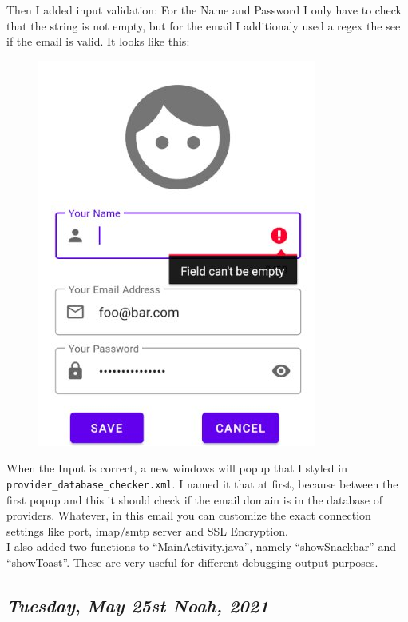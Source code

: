 Then I added input validation: For the Name and Password I only have to check that the string is not empty, but for the email I additionaly used a regex the see if the email is valid. It looks like this:\\

\begin{figure}[H]
\centering
\includegraphics[height=.3\textheight]{media/newemail}
\end{figure}

When the Input is correct, a new windows will popup that I styled in \texttt{provider\_database\_checker.xml}. I named it that at first, because between the first popup and this it should check if the email domain is in the database of providers. Whatever, in this email you can customize the exact connection settings like port, imap/smtp server and SSL Encryption.\\

I also added two functions to ``MainActivity.java'', namely ``showSnackbar'' and ``showToast''. These are very useful for different debugging output purposes.


\def\day{\textit{May 25st Noah, 2021}}
\def\weekday{\textit{Tuesday}}
\subsection*{\weekday, \day}

